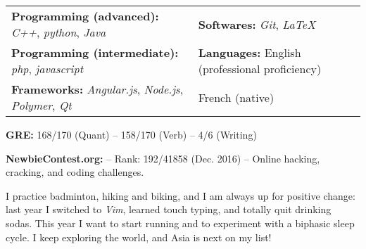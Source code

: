 \documentclass[a4paper, 12pt]{article}
\newcommand{\marginmisc}{0.15cm}
\begin{document}
\begin{footnotesize}
\noindent\begin{tabular}{@{}p{9cm}p{8cm}}
  \textbf{Programming (advanced):} \textit{C++}, \textit{python}, \textit{Java} & \textbf{Softwares:} \textit{Git}, \textit{LaTeX}\\
  \textbf{Programming (intermediate):} \textit{php}, \textit{javascript} & \textbf{Languages:} English (professional proficiency)\\
  \textbf{Frameworks:} \textit{Angular.js}, \textit{Node.js}, \textit{Polymer}, \textit{Qt} & \hspace{2cm} French (native)
\end{tabular}

\vspace{\marginmisc}
\textbf{GRE:} 168/170 (Quant) -- 158/170 (Verb) -- 4/6 (Writing)

\vspace{\marginmisc}
\textbf{NewbieContest.org:} -- Rank: 192/41858 (Dec. 2016) -- Online hacking, cracking, and coding challenges.

\vspace{\marginmisc}
I practice badminton, hiking and biking, and I am always up for positive change: last year I switched to \textit{Vim}, learned touch typing, and totally quit drinking sodas. This year I want to start running and to experiment with a biphasic sleep cycle. I keep exploring the world, and Asia is next on my list! 
  
\end{footnotesize}
\end{document}
